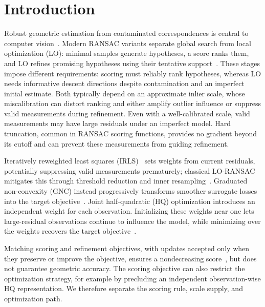 \documentclass[runningheads]{llncs}
\begin{document}
\section{Introduction}
\label{sec:intro}
Robust geometric estimation from contaminated correspondences is
central to computer vision~\cite{Fischler1981,Huber1981,Maronna2019}.
Modern RANSAC variants separate global search from local optimization
(LO): minimal samples generate hypotheses, a score ranks them, and LO
refines promising hypotheses using their tentative
support~\cite{Chum2003,Lebeda2012}. These stages impose different
requirements: scoring must reliably rank hypotheses, whereas LO needs
informative descent directions despite contamination and an imperfect
initial estimate. Both typically depend on an approximate inlier
scale, whose miscalibration can distort ranking and either amplify
outlier influence or suppress valid measurements during refinement.
Even with a well-calibrated scale, valid measurements may have large
residuals under an imperfect model. Hard truncation, common in RANSAC
scoring functions, provides no gradient beyond its cutoff and can
prevent these measurements from guiding refinement.

Iteratively reweighted least squares
(IRLS)~\cite{HollandWelsch1977,Maronna2019} sets weights from current
residuals, potentially suppressing valid measurements prematurely;
classical LO-RANSAC mitigates this through threshold reduction and
inner resampling~\cite{Chum2003,Lebeda2012}.  Graduated non-convexity
(GNC) instead progressively transforms smoother surrogate losses into
the target
objective~\cite{BlakeZisserman1987,BlackRangarajan1996,YangCarlone2020}.
Joint half-quadratic (HQ) optimization introduces an independent
weight for each observation. Initializing these weights near one lets
large-residual observations continue to influence the model, while
minimizing over the weights recovers the target
objective~\cite{BlackRangarajan1996,Zach2014,ZachBourmaud2018}.

Matching scoring and refinement objectives, with updates accepted
only when they preserve or improve the objective, ensures a
nondecreasing score~\cite{Shekhovtsov2025}, but does not guarantee
geometric accuracy. The scoring objective can also restrict the
optimization strategy, for example by precluding an independent
observation-wise HQ representation. We therefore separate the scoring
rule, scale supply, and optimization path.
\end{document}
